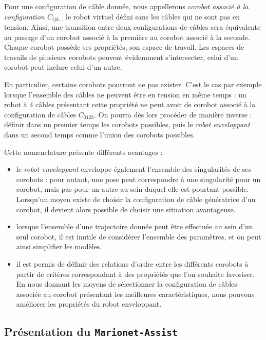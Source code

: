 Pour une configuration de câble donnée, nous appellerons {\it corobot associé à la configuration $C_{ijk\dots}$} le robot virtuel défini sans les câbles qui ne sont pas en tension. Ainsi, une transition entre deux configurations de câbles sera équivalente au passage d'un corobot associé à la première au corobot associé à la seconde. Chaque corobot possède ses propriétés, son espace de travail. Les espaces de travails de plusieurs corobots peuvent évidemment s'intersecter, celui d'un corobot peut inclure celui d'un autre.

En particulier, certains corobots pourront ne pas exister. C'est le cas par exemple lorsque l'ensemble des câbles ne peuvent être en tension en même temps : un robot à $4$ câbles présentant cette propriété ne peut avoir de corobot associé à la configuration de câbles $C_{0123}$. On pourra dès lors procéder de manière inverse : définir dans un premier temps les corobots possibles, puis le {\it robot enveloppant} dans un second temps comme l'union des corobots possibles.

Cette nomenclature présente différents avantages :
\begin{itemize}
 \item le {\it robot enveloppant} enveloppe également l'ensemble des singularités de ses corobots : pour autant, une pose peut correspondre à une singularité pour un corobot, mais pas pour un autre au sein duquel elle est pourtant possible. Lorsqu'un moyen existe de choisir la configuration de câble génératrice d'un corobot, il devient alors possible de choisir une situation avantageuse.
 \item lorsque l'ensemble d'une trajectoire donnée peut être effectuée au sein d'un seul corobot, il est inutile de considérer l'ensemble des paramètres, et on peut ainsi simplifier les modèles.
 \item il est permis de définir des relations d'ordre entre les différents corobots à partir de critères correspondant à des propriétés que l'on souhaite favoriser. En nous donnant les moyens de sélectionner la configuration de câbles associée au corobot présentant les meilleures caractéristiques, nous pouvons améliorer les propriétés du robot enveloppant.
\end{itemize}


\subsection{Présentation du {\tt Marionet-Assist}}

